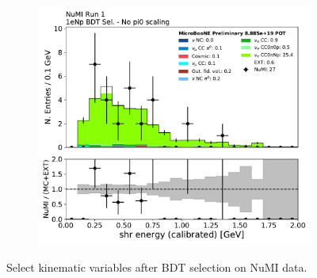 \begin{figure}[H]
\begin{subfigure}{0.3\textwidth}
    \caption{}
    \end{subfigure}
    \begin{subfigure}{0.3\textwidth}
    \includegraphics[width=1.0\textwidth]{Sidebands/Figures/NuMI/1eNp/BDTSel/shr_energy_tot_cali.pdf}
    \caption{}
    \end{subfigure}
    \caption{Select kinematic variables after \npsel BDT selection on NuMI data.} 
    \label{fig:NuMI_1eNp_9}
\end{figure}

